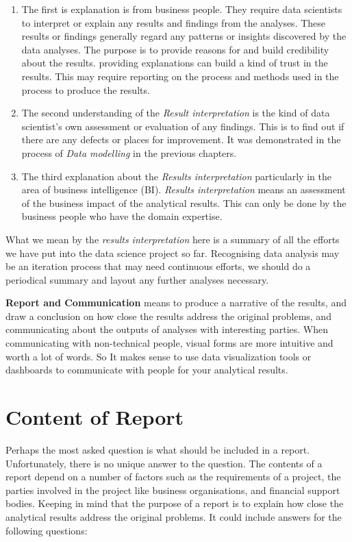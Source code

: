 \documentclass[
]{book}
\begin{document}
\begin{enumerate}
\def\labelenumi{\arabic{enumi}.}
\item
  The first is explanation is from business people. They require data scientists to interpret or explain any results and findings from the analyses. These results or findings generally regard any patterns or insights discovered by the data analyses. The purpose is to provide reasons for and build credibility about the results. providing explanations can build a kind of trust in the results. This may require reporting on the process and methods used in the process to produce the results.
\item
  The second understanding of the \emph{Result interpretation} is the kind of data scientist's own assessment or evaluation of any findings. This is to find out if there are any defects or places for improvement. It was demonstrated in the process of \emph{Data modelling} in the previous chapters.
\item
  The third explanation about the \emph{Results interpretation} particularly in the area of business intelligence (BI). \emph{Results interpretation} means an assessment of the business impact of the analytical results. This can only be done by the business people who have the domain expertise.
\end{enumerate}

What we mean by the \emph{results interpretation} here is a summary of all the efforts we have put into the data science project so far. Recognising data analysis may be an iteration process that may need continuous efforts, we should do a periodical summary and layout any further analyses necessary.

\textbf{Report and Communication} means to produce a narrative of the results, and draw a conclusion on how close the results address the original problems, and communicating about the outputs of analyses with interesting parties. When communicating with non-technical people, visual forms are more intuitive and worth a lot of words. So It makes sense to use data visualization tools or dashboards to communicate with people for your analytical results.

\hypertarget{content-of-report}{%
\section{Content of Report}\label{content-of-report}}

Perhaps the most asked question is what should be included in a report. Unfortunately, there is no unique answer to the question. The contents of a report depend on a number of factors such as the requirements of a project, the parties involved in the project like business organisations, and financial support bodies. Keeping in mind that the purpose of a report is to explain how close the analytical results address the original problems. It could include answers for the following questions:
\end{document}
